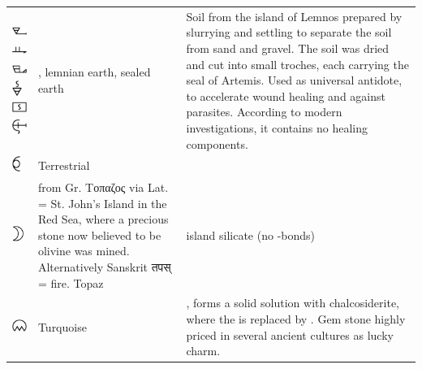 \documentclass[british,final,landscape]{scrartcl}
\begin{document}
\begin{refsection}
\begin{supertabular}{p{0.3\textwidth}p{0.34\textwidth}p{0.34\textwidth}}
   \includegraphics[height=5mm]{Mineral/Lemnia} \includegraphics[height=5mm]{Mineral/Lemnia2} \includegraphics[height=5mm]{Mineral/Lemnia3} \includegraphics[height=5mm]{Mineral/Lemnia4} \includegraphics[height=5mm]{Mineral/Lemnia5} \includegraphics[height=5mm]{Mineral/Lemnia6} & , lemnian earth, sealed earth & Soil from the island of Lemnos prepared by slurrying and settling to separate the soil from sand and gravel. The soil was dried and cut into small troches, each carrying the seal of Artemis. Used as universal antidote, to accelerate wound healing and against parasites. According to modern investigations, it contains no healing components. \\
   \includegraphics[height=5mm]{Mineral/Terrestrial}  & Terrestrial & \\
   \includegraphics[height=5mm]{Mineral/Topaz}  & from Gr. \foreignlanguage{greek}{Τοπαζος}  via Lat.  =  St. John's Island in the Red Sea, where a precious stone now believed to be olivine was mined. Alternatively Sanskrit \foreignlanguage{sanskrit}{तपस् }  = fire. Topaz  & island silicate (no -bonds)  \\
   \includegraphics[width=5mm]{Mineral/Turquoise}  & Turquoise & , forms a solid solution with chalcosiderite, where the  is replaced by . Gem stone highly priced in several ancient cultures as lucky charm.  \\
 \end{supertabular}


\end{refsection}
\end{document}
